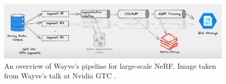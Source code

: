 \begin{figure}[!h]
    \centering
    \includegraphics[width=1.0\textwidth]{figures/wayve-pipeline.png}
    \caption{An overview of Wayve's pipeline for large-scale NeRF. Image taken from Wayve's talk at Nvidia GTC \cite{sokolski2023building}.}
    \label{fig:wayve-pipeline}
\end{figure}